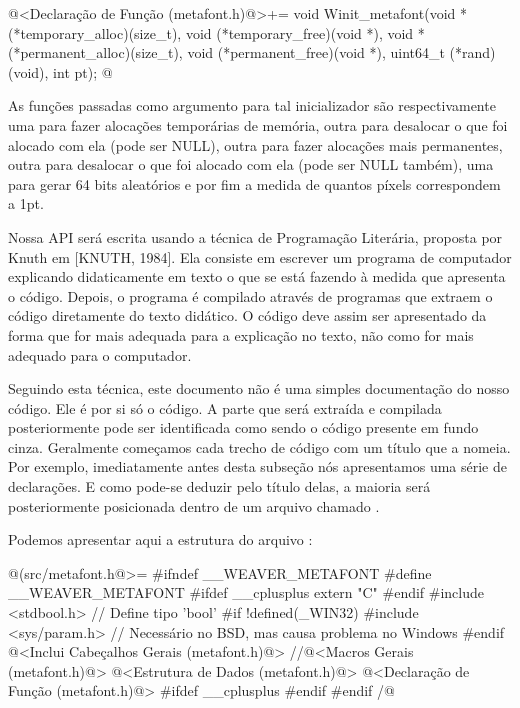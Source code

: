 \iniciocodigo
@<Declaração de Função (metafont.h)@>+=
void Winit_metafont(void *(*temporary_alloc)(size_t),
                    void (*temporary_free)(void *),
                    void *(*permanent_alloc)(size_t),
                    void (*permanent_free)(void *),
                    uint64_t (*rand)(void), int pt);
@
\fimcodigo

As funções passadas como argumento para tal inicializador são
respectivamente uma para fazer alocações temporárias de memória, outra
para desalocar o que foi alocado com ela (pode ser NULL), outra para
fazer alocações mais permanentes, outra para desalocar o que foi
alocado com ela (pode ser NULL também), uma para gerar 64 bits
aleatórios e por fim a medida de quantos píxels correspondem a 1pt.



Nossa API será escrita usando a técnica de Programação Literária,
proposta por Knuth em [KNUTH, 1984]. Ela consiste em escrever um
programa de computador explicando didaticamente em texto o que se está
fazendo à medida que apresenta o código. Depois, o programa é
compilado através de programas que extraem o código diretamente do
texto didático. O código deve assim ser apresentado da forma que for
mais adequada para a explicação no texto, não como for mais adequado
para o computador.

Seguindo esta técnica, este documento não é uma simples documentação
do nosso código. Ele é por si só o código. A parte que será extraída e
compilada posteriormente pode ser identificada como sendo o código
presente em fundo cinza. Geralmente começamos cada trecho de código
com um título que a nomeia. Por exemplo, imediatamente antes desta
subseção nós apresentamos uma série de declarações. E como pode-se
deduzir pelo título delas, a maioria será posteriormente posicionada
dentro de um arquivo chamado .

Podemos apresentar aqui a estrutura do arquivo
:

\iniciocodigo
@(src/metafont.h@>=
#ifndef __WEAVER_METAFONT
#define __WEAVER_METAFONT
#ifdef __cplusplus
extern "C" {
#endif
#include <stdbool.h> // Define tipo 'bool'
#if !defined(_WIN32)
#include <sys/param.h> // Necessário no BSD, mas causa problema no Windows
#endif
@<Inclui Cabeçalhos Gerais (metafont.h)@>
//@<Macros Gerais (metafont.h)@>
@<Estrutura de Dados (metafont.h)@>
@<Declaração de Função (metafont.h)@>
#ifdef __cplusplus
}
#endif
#endif
/@
\fimcodigo

